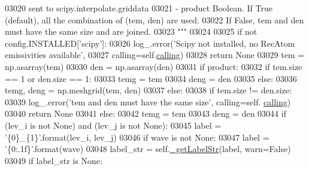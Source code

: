 \begin{DoxyCode}
03020 \textcolor{stringliteral}{                             sent to scipy.interpolate.griddata    }
03021 \textcolor{stringliteral}{            - product        Boolean. If True (default), all the combination of (tem, den) are used. }
03022 \textcolor{stringliteral}{                             If False, tem and den must have the same size and are joined.}
03023 \textcolor{stringliteral}{        """}
03024         
03025         \textcolor{keywordflow}{if} \textcolor{keywordflow}{not} config.INSTALLED[\textcolor{stringliteral}{'scipy'}]:
03026             log\_.error(\textcolor{stringliteral}{'Scipy not installed, no RecAtom emissivities available'},
03027                           calling=self.\hyperlink{classpyneb_1_1core_1_1pynebcore_1_1_rec_atom_a82ec425ebba32b73a5d9ae52717d47c4}{calling})
03028             \textcolor{keywordflow}{return} \textcolor{keywordtype}{None}
03029         tem = np.asarray(tem)
03030         den = np.asarray(den)
03031         \textcolor{keywordflow}{if} product:
03032             \textcolor{keywordflow}{if} tem.size == 1 \textcolor{keywordflow}{or} den.size == 1:
03033                 temg = tem
03034                 deng = den
03035             \textcolor{keywordflow}{else}:
03036                 temg, deng = np.meshgrid(tem, den)
03037         \textcolor{keywordflow}{else}:
03038             \textcolor{keywordflow}{if} tem.size != den.size:
03039                 log\_.error(\textcolor{stringliteral}{'tem and den must have the same size'}, calling=self.
      \hyperlink{classpyneb_1_1core_1_1pynebcore_1_1_rec_atom_a82ec425ebba32b73a5d9ae52717d47c4}{calling})
03040                 \textcolor{keywordflow}{return} \textcolor{keywordtype}{None}
03041             \textcolor{keywordflow}{else}:
03042                 temg = tem
03043                 deng = den
03044         \textcolor{keywordflow}{if} (lev\_i \textcolor{keywordflow}{is} \textcolor{keywordflow}{not} \textcolor{keywordtype}{None}) \textcolor{keywordflow}{and} (lev\_j \textcolor{keywordflow}{is} \textcolor{keywordflow}{not} \textcolor{keywordtype}{None}):
03045             label = \textcolor{stringliteral}{'\{0\}\_\{1\}'}.format(lev\_i, lev\_j)
03046         \textcolor{keywordflow}{if} wave \textcolor{keywordflow}{is} \textcolor{keywordflow}{not} \textcolor{keywordtype}{None}:
03047             label = \textcolor{stringliteral}{'\{0:.1f\}'}.format(wave)
03048             label\_str = self.\hyperlink{classpyneb_1_1core_1_1pynebcore_1_1_rec_atom_afecb53ee6cdd96699b3b9250fbcc957e}{\_getLabelStr}(label, warn=\textcolor{keyword}{False})
03049             \textcolor{keywordflow}{if} label\_str \textcolor{keywordflow}{is} \textcolor{keywordtype}{None}:

\end{DoxyCode}
